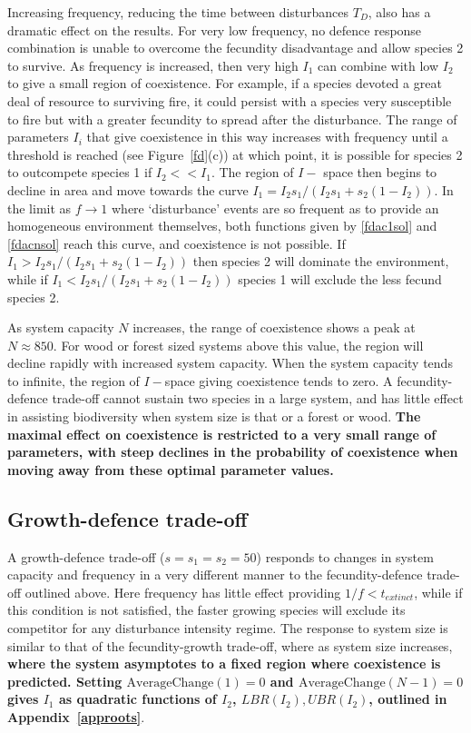Increasing frequency, reducing the time between disturbances $T_D$, also has a dramatic effect on the results. For very low frequency, no defence response combination is unable to overcome the fecundity disadvantage and allow species 2 to survive. As frequency is increased, then very high $I_1$ can combine with low $I_2$ to give a small region of coexistence. For example, if a species devoted a great deal of resource to surviving fire, it could persist with a species very susceptible to fire but with a greater fecundity to spread after the disturbance. The range of parameters $I_i$ that give coexistence in this way increases with frequency until a threshold is reached (see Figure~\ref{fd}(c)) at which point, it is possible for species 2 to outcompete species 1 if $I_2<<I_1$. The region of $I-$ space then begins to decline in area and move towards the curve $I_1=I_2s_1/(I_2s_1+s_2(1-I_2))$. In the limit as $f \to 1$ where `disturbance' events are so frequent as to provide an homogeneous environment themselves, both functions given by \eqref{fdac1sol} and \eqref{fdacnsol} reach this curve, and coexistence is not possible. If $I_1>I_2s_1/(I_2s_1+s_2(1-I_2))$ then species 2 will dominate the environment, while if $I_1<I_2s_1/(I_2s_1+s_2(1-I_2))$ species 1 will exclude the less fecund species 2.

As system capacity $N$ increases, the range of coexistence shows a peak at $N \approx 850$. For wood or forest sized systems above this value, the region will decline rapidly with increased system capacity. When the system capacity tends to infinite, the region of $I-$space giving coexistence tends to zero. A fecundity-defence trade-off cannot sustain two species in a large system, and has little effect in assisting biodiversity when system size is that or a forest or wood. \textbf{The maximal effect on coexistence is restricted to a very small range of parameters, with steep declines in the probability of coexistence when moving away from these optimal parameter values.} 

\subsection{Growth-defence trade-off}
A growth-defence trade-off ($s=s_1=s_2=50$) responds to changes in system capacity and frequency in a very different manner to the fecundity-defence trade-off outlined above. Here frequency has little effect providing $1/f<t_{extinct}$, while if this condition is not satisfied, the faster growing species will exclude its competitor for any disturbance intensity regime. The response to system size is similar to that of the fecundity-growth trade-off, where as system size increases, \textbf{where the system asymptotes to a fixed region where coexistence is predicted. Setting $\text{AverageChange}(1)=0$ and $\text{AverageChange}(N-1)=0$ gives $I_1$ as quadratic functions of $I_2$, $LBR(I_2), UBR(I_2)$, outlined in Appendix~\ref{approots}}.


